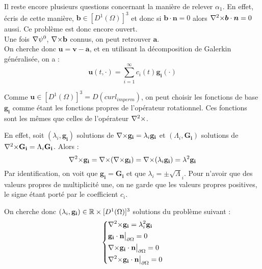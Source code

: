 Il reste encore plusieurs questions concernant la manière de relever $\alpha_1$. En effet, écris de cette manière, $\bm{b}\in [D^1(\Omega)]^3$ et donc si $\bm{b}\cdot\bm{n}=0$ alors ${\nabla^2\times}\bm{b}\cdot\bm{n}=0$ aussi. Ce problème est donc encore ouvert.\\

Une fois ${\nabla}\psi^0$, ${\nabla\times} \mathbf{b}$ connus, on peut retrouver $\mathbf{a}$.\\

On cherche donc $\mathbf{u}=\mathbf{v}-\mathbf{a}$, et en utilisant la décomposition de Galerkin généralisée, on a :
\begin{equation}\label{u}
\mathbf{u}(t,\cdot) = \sum_{i=1}^{\infty} c_i(t)\mathbf{g_i}(\cdot)
\end{equation}

Comme $\mathbf{u}\in [D^1(\Omega)]^3=D(curl_{imperm})$, on peut choisir les fonctions de base
$\mathbf{g_i}$ comme étant les fonctions propres de l'opérateur rotationnel. Ces
fonctions sont les mêmes que celles de l'opérateur ${\nabla^2\times}$.

En effet, soit $(\lambda_i,\mathbf{g_i})$ solutions de ${\nabla\times} \mathbf{g_i} = \lambda_i\mathbf{g_i}$ et $(\Lambda_i,\mathbf{G_i})$ solutions de ${\nabla^2\times} \mathbf{G_i} = \Lambda_i\mathbf{G_i}$. Alors :
\[ {\nabla^2\times} \mathbf{g_i} = {\nabla\times}({\nabla\times} \mathbf{g_i})={\nabla\times}(\lambda_i\mathbf{g_i})=\lambda^2\mathbf{g_i} \]
Par identification, on voit que $\mathbf{g_i}=\mathbf{G_i}$ et que $\lambda_i=\pm\sqrt\Lambda_i$. Pour n'avoir que des valeurs propres de multiplicité une, on ne garde que les valeurs propres positives, le signe étant porté par le coefficient $c_i$.

On cherche donc $(\lambda_i,\mathbf{g_i})\in{\mathbb{R}}\times [D^1(\Omega)]^3$ solutions du problème suivant :
\begin{equation}\label{curlcurl}
\left\{\begin{aligned}
&{\nabla^2\times}  \mathbf{g_i} = \lambda_i^2 \mathbf{g_i}\\
&\mathbf{g_i}\cdot \mathbf{n}{\big\rvert_{\partial\Omega}} = 0\\
&{\nabla\times} \mathbf{g_i}\cdot \mathbf{n}{\big\rvert_{\partial\Omega}} = 0\\
&{\nabla^2\times}  \mathbf{g_i}\cdot \mathbf{n}{\big\rvert_{\partial\Omega}} = 0
\end{aligned}\right.
\end{equation}

